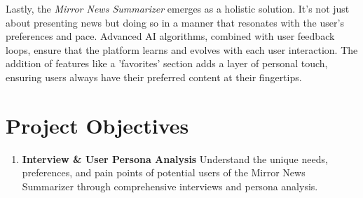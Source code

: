 \documentclass[a4paper]{article}
\begin{document}
Lastly, the \textit{Mirror News Summarizer} emerges as a holistic solution. It's not just about presenting news but doing so in a manner that resonates with the user's preferences and pace. Advanced AI algorithms, combined with user feedback loops, ensure that the platform learns and evolves with each user interaction. The addition of features like a 'favorites' section adds a layer of personal touch, ensuring users always have their preferred content at their fingertips.

\section{Project Objectives}

\begin{enumerate}
    \item \textbf{Interview \& User Persona Analysis}
    \subitem Understand the unique needs, preferences, and pain points of potential users of the Mirror News Summarizer through comprehensive interviews and persona analysis.

\end{enumerate}
\end{document}
